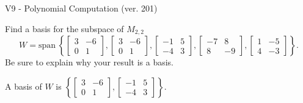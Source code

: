 \begin{exercise}
  \begin{exerciseTitle}V9 - Polynomial Computation (ver. 201)\end{exerciseTitle}
  \begin{exerciseStatement}
    Find a basis for the subspace of \(M_{2,2}\) 
\[W=\mathrm{span}\ \left\{\left[\begin{array}{cc}
3 & -6 \\
0 & 1
\end{array}\right] , \left[\begin{array}{cc}
3 & -6 \\
0 & 1
\end{array}\right] , \left[\begin{array}{cc}
-1 & 5 \\
-4 & 3
\end{array}\right] , \left[\begin{array}{cc}
-7 & 8 \\
8 & -9
\end{array}\right] , \left[\begin{array}{cc}
1 & -5 \\
4 & -3
\end{array}\right]\right\}.\]
 Be sure to explain why your result is a basis.


  \end{exerciseStatement}
  \begin{exerciseAnswer}
   A basis of \(W\) is  \(\left\{\left[\begin{array}{cc}
3 & -6 \\
0 & 1
\end{array}\right] , \left[\begin{array}{cc}
-1 & 5 \\
-4 & 3
\end{array}\right]\right\}\).
  


  \end{exerciseAnswer}
\end{exercise}